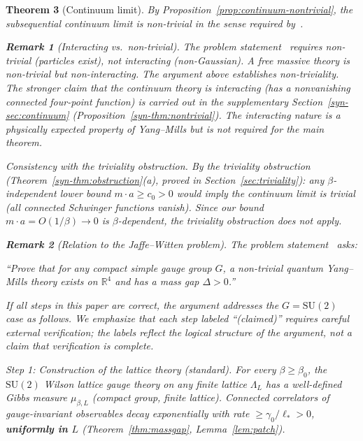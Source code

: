 \documentclass[11pt]{article}
\newtheorem{theorem}{Theorem}[section]
\theoremstyle{definition}
\newtheorem{remark}[theorem]{Remark}
\newcommand{\SU}{\mathrm{SU}}
\newcommand{\R}{\mathbb{R}}
\begin{document}
\begin{theorem}[Continuum limit]
\noindent
By Proposition~\ref{prop:continuum-nontrivial}, the
subsequential continuum limit is non-trivial
in the sense required by~\cite{JaffeWitten}.

\begin{remark}[Interacting vs.\ non-trivial]%
\label{rem:interacting}
The problem statement~\cite{JaffeWitten} requires \emph{non-trivial} (particles exist),
not \emph{interacting} (non-Gaussian).  A free massive theory
is non-trivial but non-interacting.  The argument above
establishes non-triviality.  The stronger claim that the
continuum theory is interacting (has a nonvanishing connected
four-point function) is carried
out in the supplementary Section~\ref{syn-sec:continuum}
(Proposition~\ref{syn-thm:nontrivial}).
The interacting nature is a physically expected property
of Yang--Mills but is not required for the main theorem.
\end{remark}

\emph{Consistency with the triviality obstruction.}
By the triviality obstruction
(Theorem~\ref{syn-thm:obstruction}(a), proved in
Section~\ref{sec:triviality}): any $\beta$-\emph{independent}
lower bound $m\cdot a\ge c_0>0$ would imply the continuum
limit is trivial (all connected Schwinger functions vanish).
Since our bound $m\cdot a=O(1/\beta)\to 0$ is
$\beta$-dependent, the triviality obstruction does not apply.

\begin{remark}[Relation to the Jaffe--Witten problem]%
\label{rem:part1-part2}
The problem statement~\cite{JaffeWitten} asks:

\emph{``Prove that for any compact simple gauge group $G$,
a non-trivial quantum Yang--Mills theory exists on $\R^4$
and has a mass gap $\Delta>0$.''}

If all steps in this paper are correct, the argument addresses
the $G=\SU(2)$ case as follows.  We emphasize that each
step labeled ``(claimed)'' requires careful external
verification; the labels reflect the logical structure
of the argument, not a claim that verification is complete.

\emph{Step 1: Construction of the lattice theory (standard).}
For every $\beta\ge\beta_0$, the $\SU(2)$ Wilson lattice gauge
theory on any finite lattice $\Lambda_L$ has a well-defined
Gibbs measure $\mu_{\beta,L}$ (compact group, finite lattice).
Connected correlators of gauge-invariant observables decay
exponentially with rate $\ge\gamma_0/\ell_*>0$,
\textbf{uniformly in $L$}
(Theorem~\ref{thm:massgap}, Lemma~\ref{lem:patch}).


\end{remark}
\end{theorem}
\end{document}
